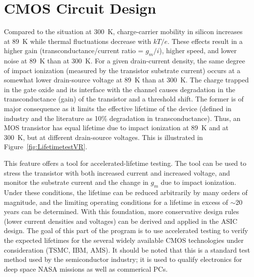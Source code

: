 \section{CMOS Circuit Design}
\label{sec:fe_CMOS}


Compared to the situation at 300~K, charge-carrier mobility in silicon increases at 89~K
while thermal fluctuations decrease with $kT/e$.
These effects result in a higher gain (transconductance/current ratio = $g_{m}/ i$), higher speed, and lower noise
at 89~K than at 300~K.
For a given drain-current density, the same degree of impact ionization (measured by the transistor substrate current)
occurs at a somewhat lower drain-source voltage at 89~K than at 300~K.
The charge trapped in the gate oxide and its interface with the channel causes degradation in the transconductance (gain)
of the transistor and a threshold shift.
The former is of major consequence as it limits the effective lifetime of the device
(defined in industry and the literature as 10\% degradation in transconductance).
Thus, an MOS transistor has equal lifetime due to impact ionization at 89~K and at 300~K, but at different drain-source voltages.
This is illustrated in Figure~\ref{fig:LifetimetestVR}.  

This feature offers a tool for accelerated-lifetime testing. The tool can be used to stress the transistor with both increased current
and increased voltage, and monitor the substrate current and the change in $g_{m}$ due to impact ionization.
Under these conditions, the lifetime can be reduced arbitrarily by many orders of magnitude,
and the limiting operating conditions for a lifetime in excess of $\sim$20 years can be determined.
With this foundation, more conservative design rules (lower current densities and voltages)
can be derived and applied in the ASIC design.
The goal of this part of the program  is to use accelerated testing to verify the expected lifetimes for the several
widely available CMOS technologies under consideration (TSMC, IBM, AMS).
It should be noted that this is a standard test method used by the semiconductor industry;
it is used to qualify electronics for deep space NASA missions as well as commerical PCs.
 

